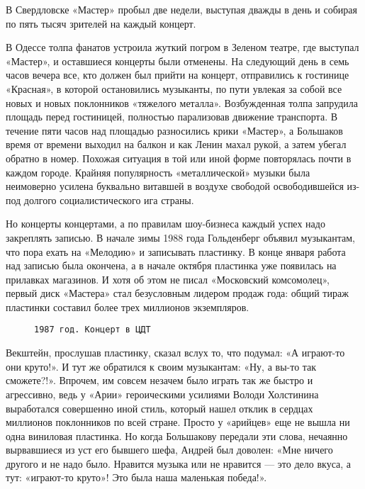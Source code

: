 В Свердловске «Мастер» пробыл две недели, выступая дважды в день и собирая по пять тысяч зрителей на каждый концерт.

В Одессе толпа фанатов устроила жуткий погром в Зеленом театре, где выступал «Мастер», и оставшиеся концерты были
отменены. На следующий день в семь часов вечера все, кто должен был прийти на концерт, отправились к гостинице
«Красная», в которой остановились музыканты, по пути увлекая за собой все новых и новых поклонников «тяжелого металла».
Возбужденная толпа запрудила площадь перед гостиницей, полностью парализовав движение транспорта. В течение пяти часов
над площадью разносились крики «Мастер», а Большаков время от времени выходил на балкон и как Ленин махал рукой, а затем
убегал обратно в номер. Похожая ситуация в той или иной форме повторялась почти в каждом городе. Крайняя популярность
«металлической» музыки была неимоверно усилена буквально витавшей в воздухе свободой освободившейся из-под долгого
социалистического ига страны.

Но концерты концертами, а по правилам шоу-бизнеса каждый успех надо закреплять записью. В начале зимы 1988 года
Гольденберг объявил музыкантам, что пора ехать на «Мелодию» и записывать пластинку. В конце января работа над записью
была окончена, а в начале октября пластинка уже появилась на прилавках магазинов. И хотя об этом не писал «Московский
комсомолец», первый диск «Мастера» стал безусловным лидером продаж года: общий тираж пластинки составил более трех
миллионов экземпляров.

\begin{figure}[h]
    \centering
    \caption{\texttt{1987 год. Концерт в ЦДТ}}
\end{figure}

Векштейн, прослушав пластинку, сказал вслух то, что подумал: «А играют-то они круто!». И тут же обратился к своим
музыкантам: «Ну, а вы-то так сможете?!». Впрочем, им совсем незачем было играть так же быстро и агрессивно, ведь у
«Арии» героическими усилиями Володи Холстинина выработался совершенно иной стиль, который нашел отклик в сердцах
миллионов поклонников по всей стране. Просто у «арийцев» еще не вышла ни одна виниловая пластинка. Но когда Большакову
передали эти слова, нечаянно вырвавшиеся из уст его бывшего шефа, Андрей был доволен: «Мне ничего другого и не надо
было. Нравится музыка или не нравится — это дело вкуса, а тут: «играют-то круто»! Это была наша маленькая победа!».


